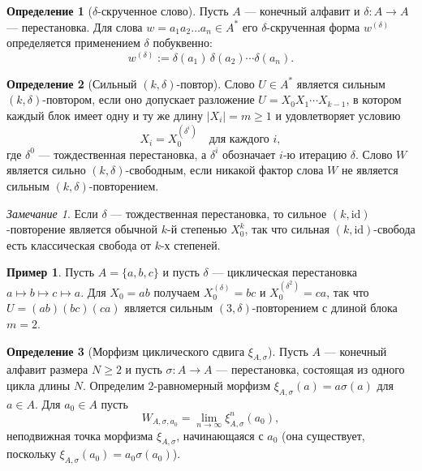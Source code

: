 \documentclass[a4paper,14pt]{extreport}
\theoremstyle{plain}
\theoremstyle{definition}
\newtheorem{definition}{Определение}[section]
\newtheorem{example}{Пример}
\theoremstyle{remark}
\newtheorem{remark}{Замечание}
\begin{document}
\begin{definition}[$\delta$-скрученное слово]\label{def:twisted_word}
	Пусть $A$ --- конечный алфавит и $\delta: A \to A$ --- перестановка. Для слова $w = a_1 a_2 \dots a_n \in A^*$ его $\delta$-скрученная форма $w^{(\delta)}$ определяется применением $\delta$ побуквенно:
	\begin{equation}
		w^{(\delta)} := \delta(a_1)\, \delta(a_2) \cdots \delta(a_n).
	\end{equation}
\end{definition}

\begin{definition}[Сильный $(k, \delta)$-повтор]\label{def:strong_repetition}
	Слово $U \in A^*$ является сильным $(k, \delta)$-повтором, если оно допускает разложение $U = X_0 X_1 \cdots X_{k-1}$, в котором каждый блок имеет одну и ту же длину $|X_i| = m \ge 1$ и удовлетворяет условию
	\begin{equation}
		X_i = X_0^{(\delta^i)} \quad \text{для каждого } i,
	\end{equation}
	где $\delta^0$ --- тождественная перестановка, а $\delta^i$ обозначает $i$-ю итерацию $\delta$. Слово $W$ является сильно $(k, \delta)$-свободным, если никакой фактор слова $W$ не является сильным $(k, \delta)$-повторением.
\end{definition}

\begin{remark}
	Если $\delta$ --- тождественная перестановка, то сильное $(k,\mathrm{id})$-повторение является обычной $k$-й степенью $X_0^k$, так что сильная $(k,\mathrm{id})$-свобода есть классическая свобода от $k$-х степеней.
\end{remark}

\begin{example}
	Пусть $A = \{a, b, c\}$ и пусть $\delta$ --- циклическая перестановка $a \mapsto b \mapsto c \mapsto a$. Для $X_0 = ab$ получаем
	$X_0^{(\delta)} = bc$ и $X_0^{(\delta^2)} = ca$, так что $U = (ab)(bc)(ca)$ является сильным $(3,\delta)$-повторением с длиной блока $m=2$.
\end{example}

\begin{definition}[Морфизм циклического сдвига $\xi_{A, \sigma}$]\label{def:psiAsigma}
	Пусть $A$ --- конечный алфавит размера $N \ge 2$ и пусть $\sigma: A \to A$ --- перестановка, состоящая из одного цикла длины $N$.
	Определим $2$-равномерный морфизм $\xi_{A, \sigma}(a) = a\sigma(a)$ для $a \in A$. Для $a_0\in A$ пусть
	\begin{equation}
		W_{A, \sigma, a_0} = \lim_{n \to \infty} \xi_{A, \sigma}^n(a_0),
	\end{equation}
	неподвижная точка морфизма $\xi_{A,\sigma}$, начинающаяся с $a_0$ (она существует, поскольку $\xi_{A,\sigma}(a_0)=a_0\sigma(a_0)$).
\end{definition}
\end{document}
